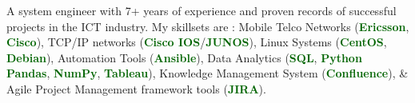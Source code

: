 
\begin{cvparagraph}

A system engineer with 7+ years of experience and proven records of successful projects in the ICT industry. My skillsets are : Mobile Telco Networks (\textcolor{darkgreen}{\textbf{Ericsson}}, \textcolor{darkgreen}{\textbf{Cisco}}), TCP/IP networks (\textcolor{darkgreen}{\textbf{Cisco IOS}}/\textcolor{darkgreen}{\textbf{JUNOS}}), Linux Systems (\textcolor{darkgreen}{\textbf{CentOS}}, \textcolor{darkgreen}{\textbf{Debian}}), Automation Tools (\textcolor{darkgreen}{\textbf{Ansible}}), Data Analytics (\textcolor{darkgreen}{\textbf{SQL}}, \textcolor{darkgreen}{\textbf{Python Pandas}}, \textcolor{darkgreen}{\textbf{NumPy}}, \textcolor{darkgreen}{\textbf{Tableau}}), Knowledge Management System (\textcolor{darkgreen}{\textbf{Confluence}}), \& Agile Project Management framework tools (\textcolor{darkgreen}{\textbf{JIRA}}). 
\end{cvparagraph}
